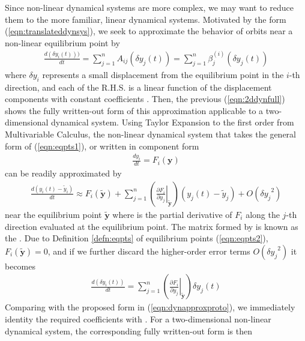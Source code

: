 Since non-linear dynamical systems are more complex, we may want to reduce them to the more familiar, linear dynamical systems. Motivated by the form (\ref{eqn:translateddynsys}), we seek to approximate the behavior of orbits near a non-linear equilibrium point by
\begin{align}
\frac{d(\delta y_i(t)))}{dt} = \sum_{j=1}^{n} A_{ij}(\delta y_j (t)) = \sum_{j=1}^{n} \beta_{j}^{(i)}(\delta y_j(t)) \label{eqn:dynapproxproto}
\end{align}
where $\delta y_i$ represents a small displacement from the equilibrium point in the $i$-th direction, and each of the R.H.S. is a linear function of the displacement components with constant coefficients . Then, the previous (\ref{eqn:2ddynfull}) shows the fully written-out form of this approximation applicable to a two-dimensional dynamical system. Using Taylor Expansion to the first order from Multivariable Calculus, the non-linear dynamical system that takes the general form of (\ref{eqn:eqpts1}), or written in component form
\begin{align}
\frac{d y_i}{dt} = F_i(\textbf{y})
\end{align}
can be readily approximated by
\begin{align}
\frac{d(y_i(t) - \tilde{y}_i)}{dt} \approx F_i(\tilde{\textbf{y}}) + \sum_{j=1}^{n} \left(\left.\frac{\partial F_i}{\partial y_j}\right|_{\tilde{\textbf{y}}}\right) (y_j(t) - \tilde{y}_j) + O({\delta y_j}^2)
\end{align}
near the equilibrium point $\tilde{\textbf{y}}$ where  is the partial derivative of $F_i$ along the $j$-th direction evaluated at the equilibrium point. The matrix formed by  is known as the . Due to Definition \ref{defn:eqpts} of equilibrium points (\ref{eqn:eqpts2}), $F_i(\tilde{\textbf{y}}) = 0$, and if we further discard the higher-order error terms $O({\delta y_j}^2)$ it becomes
\begin{align}
\frac{d(\delta y_i(t))}{dt} = \sum_{j=1}^{n}  \left(\left.\frac{\partial F_i}{\partial y_j}\right|_{\tilde{\textbf{y}}}\right) \delta y_j(t) \label{eqn:nonlindynjac}
\end{align}
Comparing with the proposed form in (\ref{eqn:dynapproxproto}), we immediately identity the required coefficients  with . For a two-dimensional non-linear dynamical system, the corresponding fully written-out form is then
